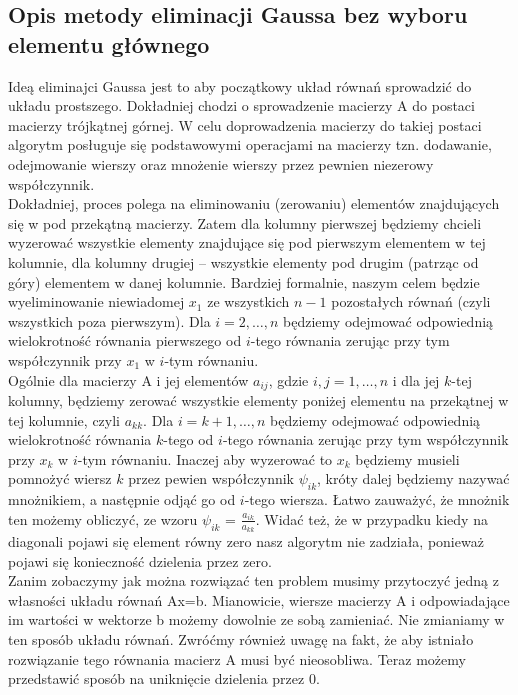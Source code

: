 \documentclass[]{article}
\begin{document}
	\subsection*{Opis metody eliminacji Gaussa bez wyboru elementu głównego}
	Ideą eliminajci Gaussa jest to aby początkowy układ równań sprowadzić do układu prostszego. Dokładniej chodzi o sprowadzenie macierzy A do postaci macierzy trójkątnej górnej. W celu doprowadzenia macierzy do takiej postaci algorytm posługuje się podstawowymi operacjami na macierzy tzn. dodawanie, odejmowanie wierszy oraz mnożenie wierszy przez pewnien niezerowy współczynnik. \\
	Dokładniej, proces polega na eliminowaniu (zerowaniu) elementów znajdujących się w pod przekątną macierzy.
	Zatem dla kolumny pierwszej będziemy chcieli wyzerować wszystkie elementy znajdujące się pod pierwszym elementem w tej kolumnie, dla kolumny drugiej -- wszystkie elementy pod drugim (patrząc od góry) elementem w danej kolumnie. Bardziej formalnie, naszym celem będzie wyeliminowanie niewiadomej $x_1$ ze wszystkich $n-1$ pozostałych równań (czyli wszystkich poza pierwszym). Dla $i = 2,\ldots,n$ będziemy odejmować odpowiednią wielokrotność równania pierwszego od $i$-tego równania zerując przy tym współczynnik przy $x_1$ w $i$-tym równaniu. \\
	Ogólnie dla macierzy A i jej elementów $a_{ij}$, gdzie $i,j = 1,\ldots,n$ i dla jej $k$-tej kolumny, będziemy zerować wszystkie elementy poniżej elementu na przekątnej w tej kolumnie, czyli $a_{kk}$. Dla $i = k+1,\ldots,n$ będziemy odejmować odpowiednią wielokrotność równania $k$-tego od $i$-tego równania zerując przy tym współczynnik przy $x_k$ w $i$-tym równaniu. Inaczej aby wyzerować to $x_k$ będziemy musieli pomnożyć wiersz $k$ przez pewien współczynnik $\psi_{ik}$, króty dalej będziemy nazywać mnożnikiem, a następnie odjąć go od $i$-tego wiersza. Łatwo zauważyć, że mnożnik ten możemy obliczyć, ze wzoru $\psi_{ik}$ = $\frac{a_{ik}}{a_{kk}}$. Widać też, że w przypadku kiedy na diagonali pojawi się element równy zero nasz algorytm nie zadziała, ponieważ pojawi się konieczność dzielenia przez zero. \\
	Zanim zobaczymy jak można rozwiązać ten problem musimy przytoczyć jedną z własności układu równań Ax=b. Mianowicie, wiersze macierzy A i odpowiadające im wartości w wektorze b możemy dowolnie ze sobą zamieniać. Nie zmianiamy w ten sposób układu równań.
	Zwróćmy również uwagę na fakt, że aby istniało rozwiązanie tego równania macierz A musi być nieosobliwa. 
	Teraz możemy przedstawić sposób na uniknięcie dzielenia przez 0. 
\end{document}
